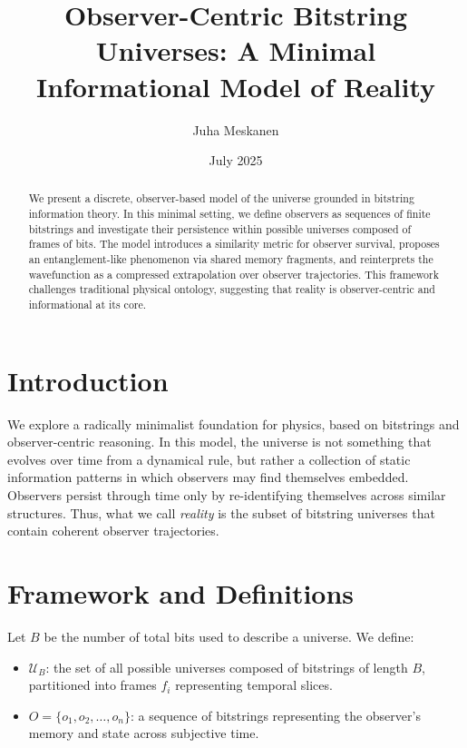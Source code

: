 \documentclass[12pt]{article}
\title{Observer-Centric Bitstring Universes: A Minimal Informational Model of Reality}
\author{Juha Meskanen}
\date{July 2025}
\begin{document}
\maketitle
\fi

\begin{abstract}
    We present a discrete, observer-based model of the universe grounded in bitstring information theory. In this minimal setting, we define observers as sequences of finite bitstrings and investigate their persistence within possible universes composed of frames of bits. The model introduces a similarity metric for observer survival, proposes an entanglement-like phenomenon via shared memory fragments, and reinterprets the wavefunction as a compressed extrapolation over observer trajectories. This framework challenges traditional physical ontology, suggesting that reality is observer-centric and informational at its core.
\end{abstract}

\section{Introduction}

We explore a radically minimalist foundation for physics, based on bitstrings and observer-centric reasoning. In this model, the universe is not something that evolves over time from a dynamical rule, but rather a collection of static information patterns in which observers may find themselves embedded. Observers persist through time only by re-identifying themselves across similar structures. Thus, what we call \emph{reality} is the subset of bitstring universes that contain coherent observer trajectories.

\section{Framework and Definitions}

Let $B$ be the number of total bits used to describe a universe. We define:

\begin{itemize}
    \item $\mathcal{U}_B$: the set of all possible universes composed of bitstrings of length $B$, partitioned into frames $f_i$ representing temporal slices.
    \item $O = \{o_1, o_2, \ldots, o_n\}$: a sequence of bitstrings representing the observer's memory and state across subjective time.
\end{itemize}
\end{document}
